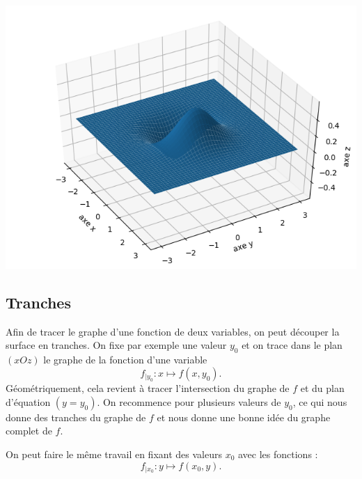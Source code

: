\documentclass[11pt,class=report,crop=false]{standalone}
\begin{document}
\begin{exemple}
\begin{center}
\includegraphics[scale=\myscale,scale=0.5]{figures/fonctions-surface-1d}
\end{center}

\end{exemple}


\subsection{Tranches}

Afin de tracer le graphe d'une fonction de deux variables, on peut découper la surface en \og{}tranches\fg{}.
On fixe par exemple une valeur $y_0$ et on trace dans le plan $(xOz)$ le graphe de la fonction d'une variable  
$$f_{|y_0} : x\mapsto f(x,y_0).$$
Géométriquement, cela revient à tracer l'intersection du graphe de $f$ et du plan d'équation $(y=y_0)$.
On recommence pour plusieurs valeurs de $y_0$, ce qui nous donne des tranches du graphe de $f$ et nous donne une bonne idée du graphe complet de $f$.

On peut faire le même travail en fixant des valeurs $x_0$ avec les fonctions :
$$f_{|x_0} : y \mapsto f(x_0,y).$$
\end{document}

